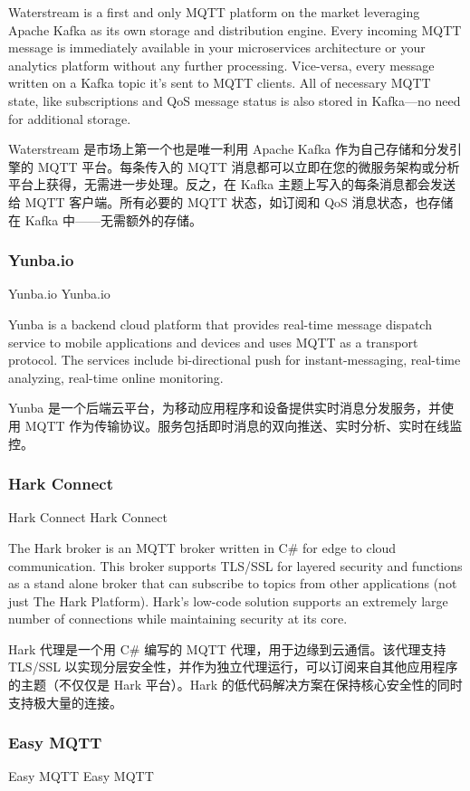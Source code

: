 \documentclass{ctexbook}
\begin{document}
Waterstream is a first and only MQTT platform on the market leveraging Apache Kafka as its own storage and distribution engine. Every incoming MQTT message is immediately available in your microservices architecture or your analytics platform without any further processing. Vice-versa, every message written on a Kafka topic it's sent to MQTT clients. All of necessary MQTT state, like subscriptions and QoS message status is also stored in Kafka—no need for additional storage.

Waterstream 是市场上第一个也是唯一利用 Apache Kafka 作为自己存储和分发引擎的 MQTT 平台。每条传入的 MQTT 消息都可以立即在您的微服务架构或分析平台上获得，无需进一步处理。反之，在 Kafka 主题上写入的每条消息都会发送给 MQTT 客户端。所有必要的 MQTT 状态，如订阅和 QoS 消息状态，也存储在 Kafka 中——无需额外的存储。

\subsubsection{Yunba.io}
Yunba.io Yunba.io

Yunba is a backend cloud platform that provides real-time message dispatch service to mobile applications and devices and uses MQTT as a transport protocol. The services include bi-directional push for instant-messaging, real-time analyzing, real-time online monitoring.

Yunba 是一个后端云平台，为移动应用程序和设备提供实时消息分发服务，并使用 MQTT 作为传输协议。服务包括即时消息的双向推送、实时分析、实时在线监控。

\subsubsection{Hark Connect}
Hark Connect Hark Connect

The Hark broker is an MQTT broker written in C\# for edge to cloud communication. This broker supports TLS/SSL for layered security and functions as a stand alone broker that can subscribe to topics from other applications (not just The Hark Platform). Hark's low-code solution supports an extremely large number of connections while maintaining security at its core.

Hark 代理是一个用 C\# 编写的 MQTT 代理，用于边缘到云通信。该代理支持 TLS/SSL 以实现分层安全性，并作为独立代理运行，可以订阅来自其他应用程序的主题（不仅仅是 Hark 平台）。Hark 的低代码解决方案在保持核心安全性的同时支持极大量的连接。

\subsubsection{Easy MQTT}
Easy MQTT Easy MQTT
\end{document}
